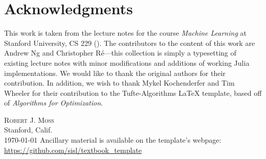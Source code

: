\chapter*{Acknowledgments}

This work is taken from the lecture notes for the course \textit{Machine Learning} at Stanford University, CS 229 (). %
The contributors to the content of this work are Andrew Ng and Christopher R\'e---this collection is simply a typesetting of existing lecture notes with minor modifications and additions of working Julia implementations. We would like to thank the original authors for their contribution.
In addition, we wish to thank Mykel Kochenderfer and Tim Wheeler for their contribution to the Tufte-Algorithms \LaTeX{} template, based off of \textit{Algorithms for Optimization}.\cite{Kochenderfer2019}




\vspace{5ex}
\noindent\textsc{Robert J. Moss}\\
Stanford, Calif.\\
\psetdate\today
\vfill
\noindent Ancillary material is available on the template's webpage:\\
\noindent\url{https://github.com/sisl/textbook_template}

